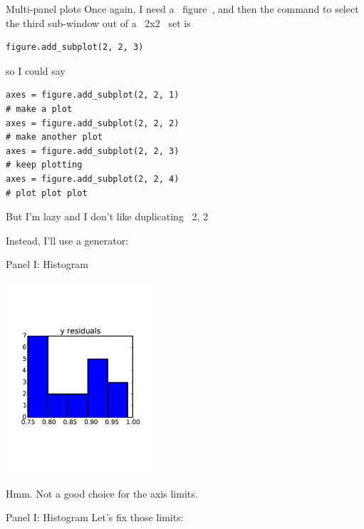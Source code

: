 \documentclass[10pt, t]{beamer}
\let\verb=\codeDelimTwiddles
\begin{document}
\begin{frame}[fragile,label=sec-3-14]{Multi-panel plots}
 Once again, I need a \verb~figure~, and then 
the command to select the third sub-window out of a \verb~2x2~ set is
\lstset{language=Python,label= ,caption= ,numbers=none}
\begin{lstlisting}
figure.add_subplot(2, 2, 3)
\end{lstlisting}
\pause so I could say
\lstset{language=Python,label= ,caption= ,numbers=none}
\begin{lstlisting}
axes = figure.add_subplot(2, 2, 1)
# make a plot
axes = figure.add_subplot(2, 2, 2)
# make another plot
axes = figure.add_subplot(2, 2, 3)
# keep plotting
axes = figure.add_subplot(2, 2, 4)
# plot plot plot
\end{lstlisting}
But I'm lazy and I don't like duplicating \verb~2, 2~

\pause
Instead, I'll use a generator:
%
\end{frame}
\begin{frame}[label=sec-3-15]{Panel I: Histogram}
\end{frame}

\begin{frame}[label=sec-3-16]{\quad}
\begin{center}
\includegraphics[width=5.5cm]{./figures/plot_histogram.pdf}
\end{center}
\pause
\vspace*{-1cm}
Hmm.  Not a good choice for the axis limits.
\end{frame}
\begin{frame}[label=sec-3-17]{Panel I: Histogram}
Let's fix those limits:
\end{frame}
\end{document}
